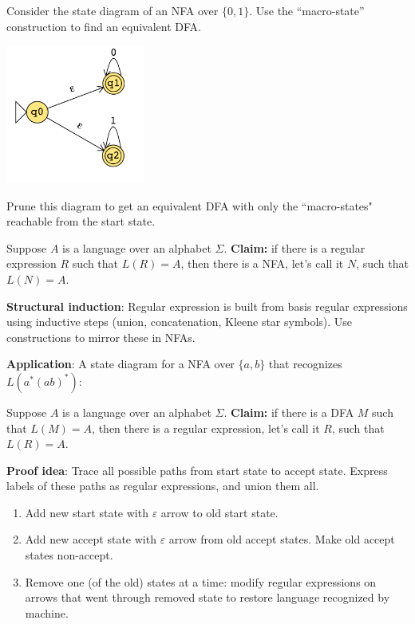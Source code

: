 \documentclass[12pt, oneside]{article}
\begin{document}
\vfill

\newpage
Consider the state diagram of an NFA over $\{0,1\}$. Use the ``macro-state'' construction 
to find an equivalent DFA.


\includegraphics[width=1.8in]{resources/machines/Lect6NFA2.png}

\vspace{50pt}

Prune this diagram to get an 
equivalent DFA 
with only the ``macro-states" reachable from the start state.

\vspace{150pt}

Suppose $A$ is a language over an alphabet $\Sigma$.
{\bf Claim:} if there is a regular expression $R$ such that $L(R) = A$, then there is a NFA, let's call it $N$, such that 
$L(N) = A$.

{\bf Structural induction}: Regular expression is built from basis regular expressions using inductive steps
(union, concatenation, Kleene star symbols). Use constructions to mirror these in NFAs.


{\bf Application}: A state diagram for a NFA over $\{a,b\}$ that recognizes $L(a^* (ab)^*)$:

\vfill

\newpage

Suppose $A$ is a language over an alphabet $\Sigma$.
{\bf Claim:} if there is a DFA $M$ such that $L(M) = A$, then there is a regular expression, let's call it $R$, such that 
$L(R) = A$.

{\bf Proof idea}: Trace all possible paths from start state to accept state.  Express labels of these paths
as regular expressions, and union them all.

\begin{enumerate}
\item Add new start state with $\varepsilon$ arrow to old start state.
\item Add new accept state with $\varepsilon$ arrow from old accept states.  Make old accept states
non-accept.
\item Remove one (of the old) states at a time: modify regular expressions on arrows that went through removed
state to restore language recognized by machine.
\end{enumerate}
\end{document}
